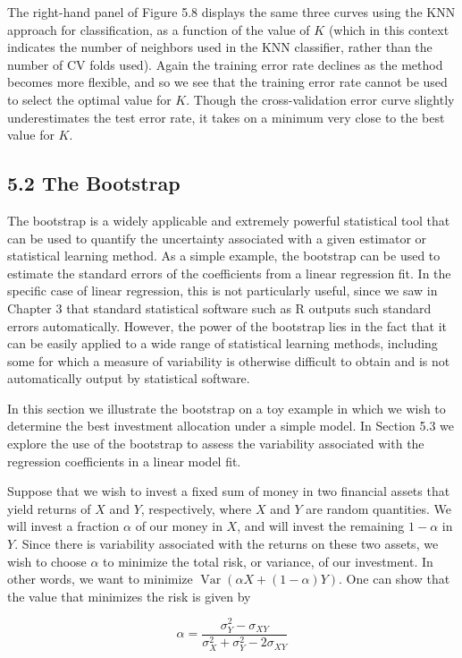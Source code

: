 \documentclass[10pt]{article}
\begin{document}
The right-hand panel of Figure 5.8 displays the same three curves using the KNN approach for classification, as a function of the value of $K$ (which in this context indicates the number of neighbors used in the KNN classifier, rather than the number of CV folds used). Again the training error rate declines as the method becomes more flexible, and so we see that the training error rate cannot be used to select the optimal value for $K$. Though the cross-validation error curve slightly underestimates the test error rate, it takes on a minimum very close to the best value for $K$.

\subsection*{5.2 The Bootstrap}
The bootstrap is a widely applicable and extremely powerful statistical tool that can be used to quantify the uncertainty associated with a given estimator or statistical learning method. As a simple example, the bootstrap can be used to estimate the standard errors of the coefficients from a linear regression fit. In the specific case of linear regression, this is not particularly useful, since we saw in Chapter 3 that standard statistical software such as R outputs such standard errors automatically. However, the power of the bootstrap lies in the fact that it can be easily applied to a wide range of statistical learning methods, including some for which a measure of variability is otherwise difficult to obtain and is not automatically output by statistical software.

In this section we illustrate the bootstrap on a toy example in which we wish to determine the best investment allocation under a simple model. In Section 5.3 we explore the use of the bootstrap to assess the variability associated with the regression coefficients in a linear model fit.

Suppose that we wish to invest a fixed sum of money in two financial assets that yield returns of $X$ and $Y$, respectively, where $X$ and $Y$ are random quantities. We will invest a fraction $\alpha$ of our money in $X$, and will invest the remaining $1-\alpha$ in $Y$. Since there is variability associated with the returns on these two assets, we wish to choose $\alpha$ to minimize the total risk, or variance, of our investment. In other words, we want to minimize $\operatorname{Var}(\alpha X+(1-\alpha) Y)$. One can show that the value that minimizes the risk is given by


\begin{equation*}
\alpha=\frac{\sigma_{Y}^{2}-\sigma_{X Y}}{\sigma_{X}^{2}+\sigma_{Y}^{2}-2 \sigma_{X Y}} \tag{5.6}
\end{equation*}
\end{document}
